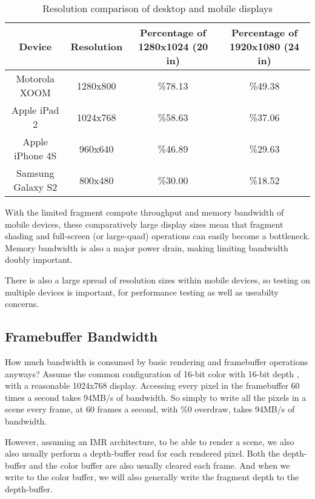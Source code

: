 \begin{table}[htb]\centering
\begin{tabular}{|c|c|c|c|}
\hline%
\small{Device} & \small{Resolution} & \small{Percentage of 1280x1024 (20 in)} & \small{Percentage of 1920x1080 (24 in)}  \\
\hline%
\small{Motorola XOOM} & \small{1280x800} & \small{\%78.13} & \small{\%49.38}\\
\hline%
\small{Apple iPad 2} & \small{1024x768} & \small{\%58.63} & \small{\%37.06}\\
\hline%
\small{Apple iPhone 4S} & \small{960x640} & \small{\%46.89} & \small{\%29.63}\\
\hline%
\small{Samsung Galaxy S2} & \small{800x480} & \small{\%30.00} & \small{\%18.52}\\
\hline%
\end{tabular}
 \caption{Resolution comparison of desktop and mobile displays}
 \label{JonMcCaffrey:resolutions}
\end{table}


With the limited fragment compute throughput and memory bandwidth of mobile devices, these comparatively large display sizes mean that fragment shading and full-screen (or large-quad) operations can easily become a bottleneck.  Memory bandwidth is also a major power drain, making limiting bandwidth doubly important.

There is also a large spread of resolution sizes within mobile devices, so testing on multiple devices is important, for performance testing as well as useabilty concerns.

\subsection{Framebuffer Bandwidth}\label{Jon-McCaffrey-Framebuffer-Bandwidth}

How much bandwidth is consumed by basic rendering and framebuffer operations anyways?  Assume the common configuration of 16-bit color with 16-bit depth \cite{GLSurfaceView}, with a reasonable 1024x768 display.  Accessing every pixel in the framebuffer 60 times a second takes 94MB/s of bandwidth.  So simply to write all the pixels in a scene every frame, at 60 frames a second, with \%0 overdraw, takes 94MB/s of bandwidth.

 

However, assuming an IMR architecture, to be able to render a scene, we also also usually perform a depth-buffer read for each rendered pixel.  Both the depth-buffer and the color buffer are also usually cleared each frame.  And when we write to the color buffer, we will also generally write the fragment depth to the depth-buffer.

